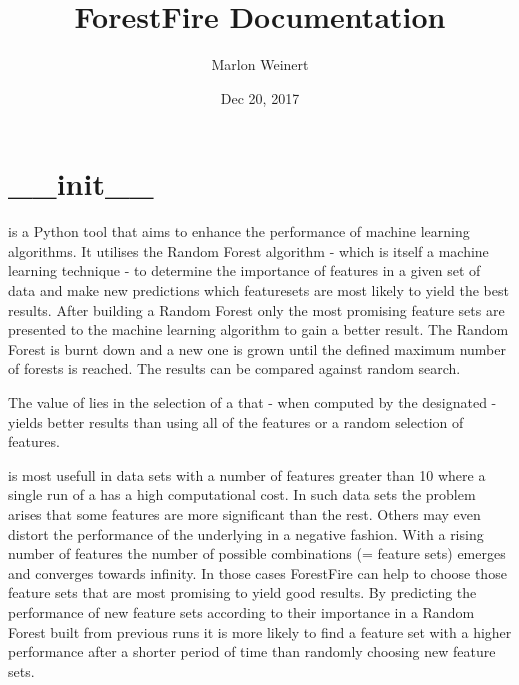 \documentclass[letterpaper,10pt,english]{sphinxmanual}
\title{ForestFire Documentation}
\date{Dec 20, 2017}
\author{Marlon Weinert}
\begin{document}
\maketitle
\sphinxtableofcontents
{}\label{\detokenize{index::doc}}



\chapter{\_\_init\_\_}
\label{\detokenize{index:init}}\label{\detokenize{index:module-ForestFire}}\label{\detokenize{index:forestfire}}
 is a Python tool that aims to enhance the performance of machine learning algorithms. 
It utilises the Random Forest algorithm - which is itself a machine learning technique - to determine the 
importance of features in a given set of data and make new predictions which featuresets are most 
likely to yield the best results. 
After building a Random Forest only the most promising feature sets are presented to the machine learning algorithm to gain a better result. 
The Random Forest is burnt down and a new one is grown until the defined maximum number of forests is reached.
The results can be compared against random search.

The value of  lies in the selection of a {\hyperref[\detokenize{Overview:term-feature-set}]{}} that - when computed by the designated {\hyperref[\detokenize{Overview:mla}]{}} - yields
better results than using all of the features or a random selection of features.

 is most usefull in data sets with a number of features greater than 10 where a single run of
a {\hyperref[\detokenize{Overview:mla}]{}} has a high computational cost. In such data sets the problem arises that some features are
more significant than the rest.
Others may even distort the performance of the underlying {\hyperref[\detokenize{Overview:mla}]{}} in a negative fashion. 
With a rising number of features the number of possible combinations (= feature sets) emerges and converges towards infinity.
In those cases ForestFire can help to choose those feature sets that are most promising to yield good results.
By predicting the performance of new feature sets according to their importance in a Random Forest built 
from previous runs it is more likely to find a feature set with a higher performance after a shorter period 
of time than randomly choosing new feature sets.
\end{document}
